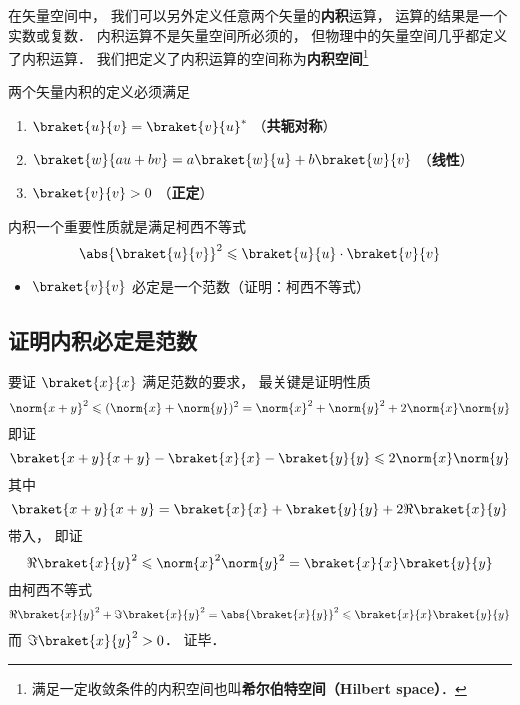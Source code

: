 

在矢量空间中， 我们可以另外定义任意两个矢量的\textbf{内积}运算， 运算的结果是一个实数或复数． 内积运算不是矢量空间所必须的， 但物理中的矢量空间几乎都定义了内积运算． 我们把定义了内积运算的空间称为\textbf{内积空间}\footnote{满足一定收敛条件的内积空间也叫\textbf{希尔伯特空间（Hilbert space）}．}%

两个矢量内积的定义必须满足
\begin{enumerate}
\item $\braket{u}{v} = \braket{v}{u}^*$ （\textbf{共轭对称}）
\item $\braket{w}{a u + b v} = a\braket{w}{u} + b\braket{w}{v}$ （\textbf{线性}）
\item $\braket{v}{v} > 0$ （\textbf{正定}）
\end{enumerate}

内积一个重要性质就是满足柯西不等式
\begin{equation}
\abs{\braket{u}{v}}^2 \leqslant \braket{u}{u} \cdot \braket{v}{v}
\end{equation}

\begin{itemize}
\item $\braket{v}{v}$ 必定是一个范数（证明：柯西不等式）
\end{itemize}

\subsection{证明内积必定是范数}
要证 $\braket{x}{x}$ 满足范数的要求， 最关键是证明性质
\begin{equation}
\norm{x+y}^2 \leqslant (\norm{x} + \norm{y})^2 = \norm{x}^2 + \norm{y}^2 + 2\norm{x}\norm{y}
\end{equation}
即证
\begin{equation}
\braket{x+y}{x+y} - \braket{x}{x} - \braket{y}{y} \leqslant 2\norm{x}\norm{y}
\end{equation}
其中
\begin{equation}
\braket{x+y}{x+y} = \braket{x}{x} + \braket{y}{y} + 2\Re{\braket{x}{y}}
\end{equation}
带入， 即证
\begin{equation}
\Re{\braket{x}{y}}^2 \leqslant \norm{x}^2\norm{y}^2 = \braket{x}{x}\braket{y}{y}
\end{equation}
由柯西不等式
\begin{equation}
\Re{\braket{x}{y}}^2 + \Im{\braket{x}{y}}^2 = \abs{\braket{x}{y}}^2 \leqslant \braket{x}{x}\braket{y}{y}
\end{equation}
而 $\Im\braket{x}{y}^2 > 0$． 证毕．
